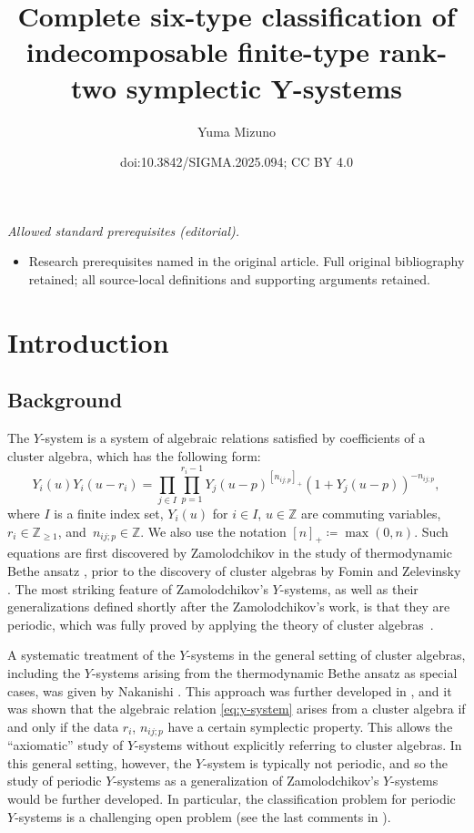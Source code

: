 \documentclass[10pt,a4paper]{amsart}
\title{Complete six-type classification of indecomposable finite-type rank-two symplectic Y-systems}
\author{Yuma Mizuno}
\date{doi:10.3842/SIGMA.2025.094; CC BY 4.0}
\numberwithin{equation}{section}
\theoremstyle{definition}
\newcommand*{\maxzero}[1]{[#1]_{+}}
\begin{document}
\maketitle
\noindent\textit{Allowed standard prerequisites (editorial).}\begin{itemize}
\item Research prerequisites named in the original article. Full original bibliography retained; all source-local definitions and supporting arguments retained.
\end{itemize}\medskip
\section{Introduction}
\subsection{Background}
The $Y$-system is a system of algebraic relations satisfied by coefficients of a cluster algebra,
which has the following form:
\begin{equation}\label{eq:y-system}
 Y_i (u) Y_i (u - r_i) =
 \prod_{j \in I} \prod_{p=1}^{r_i-1} Y_j(u-p)^{\maxzero{n_{ij;p}}} (1 + Y_j(u - p) )^{- n_{ij;p} },
\end{equation}
where $I$ is a finite index set, $Y_i (u)$ for $i \in I$, $u \in \mathbb{Z}$ are commuting variables,
$r_i \in \mathbb{Z}_{\geq 1}$, and~${n_{ij;p} \in \mathbb{Z}}$.
We also use the notation $\maxzero{n} \coloneqq \max(0, n)$.
Such equations are first discovered by Zamolodchikov in the study of thermodynamic Bethe ansatz \cite{Zamo},
prior to the discovery of cluster algebras by Fomin and Zelevinsky \cite{FZ1}.
The most striking feature of Zamolodchikov's \mbox{$Y$-systems}, as well as their generalizations \cite{KunibaNakanishi92, RVT}
defined shortly after the Zamolodchikov's work, is that they are periodic, which was fully proved by applying
the theory of cluster algebras~\cite{FZ_Ysystem, FZ4, IIKKNa, IIKKNb, Keller}.

A systematic treatment of the $Y$-systems in the general setting of cluster algebras, including the $Y$-systems arising from
the thermodynamic Bethe ansatz as special cases, was given by Nakanishi \cite{Nakb}.
This approach was further developed in \cite{mizuno2020difference},
and it was shown that the algebraic relation \eqref{eq:y-system} arises from a cluster algebra if and only if
the data $r_i$, $n_{ij;p}$ have a certain symplectic property.
This allows the ``axiomatic'' study of $Y$-systems without explicitly referring to cluster algebras.
In this general setting, however, the $Y$-system is typically not periodic,
and so the study of periodic $Y$-systems as a generalization of Zamolodchikov's $Y$-systems would be further developed.
In particular, the classification problem for periodic $Y$-systems is a challenging open problem (see the last comments in \cite[Section 3]{Nakb}).
\end{document}
